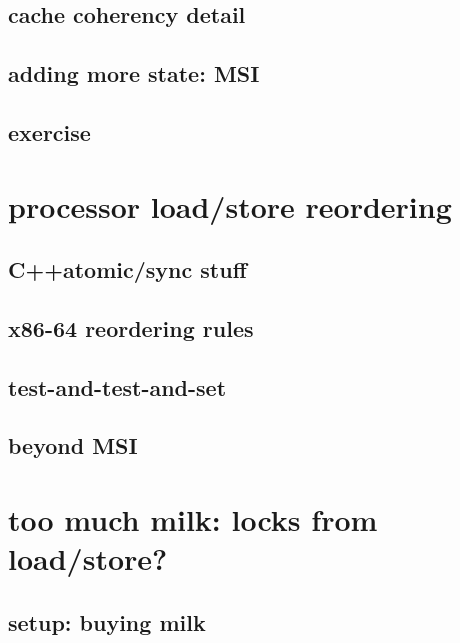 

\subsection{cache coherency detail}
\subsection{adding more state: MSI}


\subsection{exercise}



\section{processor load/store reordering}


\subsection{C++atomic/sync stuff}


\subsection{x86-64 reordering rules}




\subsection{test-and-test-and-set}




\subsection{beyond MSI}

\section{too much milk: locks from load/store?}

\subsection{setup: buying milk}


